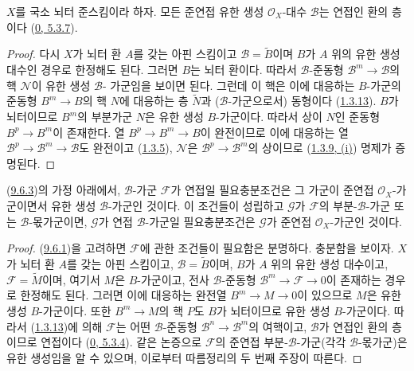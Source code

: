 \begin{proposition}[9.6.3]
\label{I.9.6.3-ko}
$X$를 국소 뇌터 준스킴이라 하자. 모든 준연접 유한 생성
$\mathscr{O}_X$-대수 $\mathscr{B}$는 연접인 환의 층이다
(\hyperref[0.5.3.7-ko]{0, 5.3.7}).
\end{proposition}

\begin{proof}
다시 $X$가 뇌터 환 $A$를 갖는 아핀 스킴이고
$\mathscr{B}=\widetilde{B}$이며 $B$가 $A$ 위의 유한 생성 대수인 경우로
한정해도 된다. 그러면 $B$는 뇌터 환이다. 따라서
$\mathscr{B}$-준동형 $\mathscr{B}^m\to\mathscr{B}$의 핵
$\mathscr{N}$이 유한 생성 $\mathscr{B}$-
가군임을 보이면 된다. 그런데 이 핵은 이에 대응하는 $B$-가군의
준동형 $B^m\to B$의 핵 $N$에 대응하는 층 $\widetilde{N}$과
($\mathscr{B}$-가군으로서) 동형이다
(\hyperref[I.1.3.13-ko]{1.3.13}). $B$가 뇌터이므로 $B^m$의 부분가군
$N$은 유한 생성 $B$-가군이다. 따라서 상이 $N$인 준동형
$B^p\to B^m$이 존재한다. 열 $B^p\to B^m\to B$이 완전이므로 이에
대응하는 열 $\mathscr{B}^p\to\mathscr{B}^m\to\mathscr{B}$도 완전이고
(\hyperref[I.1.3.5-ko]{1.3.5}), $\mathscr{N}$은
$\mathscr{B}^p\to\mathscr{B}^m$의 상이므로
(\hyperref[I.1.3.9-ko]{1.3.9, (i)}) 명제가 증명된다.
\end{proof}

\begin{corollary}[9.6.4]
\label{I.9.6.4-ko}
(\hyperref[I.9.6.3-ko]{9.6.3})의 가정 아래에서, $\mathscr{B}$-가군
$\mathscr{F}$가 연접일 필요충분조건은 그 가군이 준연접
$\mathscr{O}_X$-가군이면서 유한 생성 $\mathscr{B}$-가군인 것이다.
이 조건들이 성립하고 $\mathscr{G}$가 $\mathscr{F}$의
부분-$\mathscr{B}$-가군 또는 $\mathscr{B}$-몫가군이면,
$\mathscr{G}$가 연접 $\mathscr{B}$-가군일 필요충분조건은
$\mathscr{G}$가 준연접 $\mathscr{O}_X$-가군인 것이다.
\end{corollary}

\begin{proof}
(\hyperref[I.9.6.1-ko]{9.6.1})을 고려하면 $\mathscr{F}$에 관한 조건들이
필요함은 분명하다. 충분함을 보이자. $X$가 뇌터 환 $A$를 갖는
아핀 스킴이고, $\mathscr{B}=\widetilde{B}$이며, $B$가 $A$ 위의 유한 생성
대수이고, $\mathscr{F}=\widetilde{M}$이며, 여기서 $M$은 $B$-가군이고,
전사 $\mathscr{B}$-준동형 $\mathscr{B}^m\to\mathscr{F}\to 0$이 존재하는
경우로 한정해도 된다. 그러면 이에 대응하는 완전열
$B^m\to M\to 0$이 있으므로 $M$은 유한 생성 $B$-가군이다. 또한
$B^m\to M$의 핵 $P$도 $B$가 뇌터이므로 유한 생성 $B$-가군이다.
따라서 (\hyperref[I.1.3.13-ko]{1.3.13})에 의해 $\mathscr{F}$는 어떤
$\mathscr{B}$-준동형 $\mathscr{B}^n\to\mathscr{B}^m$의 여핵이고,
$\mathscr{B}$가 연접인 환의 층이므로 연접이다
(\hyperref[0.5.3.4-ko]{0, 5.3.4}). 같은 논증으로 $\mathscr{F}$의 준연접
부분-$\mathscr{B}$-가군(각각 $\mathscr{B}$-몫가군)은 유한 생성임을
알 수 있으며, 이로부터 따름정리의 두 번째 주장이 따른다.
\end{proof}


